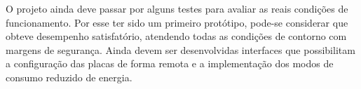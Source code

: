 \documentclass[11pt]{abntex2}
\begin{document}
			O projeto ainda deve passar por alguns testes para avaliar as reais
			condições de funcionamento. Por esse ter sido um primeiro protótipo,
			pode-se considerar que obteve desempenho satisfatório, atendendo
			todas as condições de contorno com margens de segurança. Ainda devem
			ser desenvolvidas interfaces que possibilitam a configuração das
			placas de forma remota e a implementação dos modos de consumo
			reduzido de energia.
		
		

					
\end{document}
